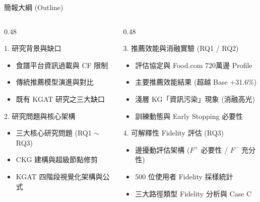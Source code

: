 \documentclass[aspectratio=169, 10pt]{beamer}
\begin{document}
\begin{frame}{簡報大綱 (Outline)}
  \begin{columns}[T]
    \begin{column}{0.48\textwidth}
      \begin{block}{1. 研究背景與缺口}
        \begin{itemize}
          \item 食譜平台資訊過載與 CF 限制
          \item 傳統推薦模型演進與對比
          \item 既有 KGAT 研究之三大缺口
        \end{itemize}
      \end{block}
      
      \begin{block}{2. 研究問題與核心架構}
        \begin{itemize}
          \item 三大核心研究問題 (RQ1 $\sim$ RQ3)
          \item CKG 建構與超級節點修剪
          \item KGAT 四階段視覺化架構與公式
        \end{itemize}
      \end{block}
    \end{column}
    
    \begin{column}{0.48\textwidth}
      \begin{block}{3. 推薦效能與消融實驗 (RQ1 / RQ2)}
        \begin{itemize}
          \item 評估協定與 Food.com 720萬邊 Profile
          \item 主要推薦效能結果 (超越 Base +31.6\%)
          \item 淺層 KG「資訊污染」現象 (消融高光)
          \item 訓練動態與 Early Stopping 必要性
        \end{itemize}
      \end{block}
      
      \begin{block}{4. 可解釋性 Fidelity 評估 (RQ3)}
        \begin{itemize}
          \item 邊擾動評估架構 ($F^+$ 必要性 / $F^-$ 充分性)
          \item 500 位使用者 Fidelity 採樣統計
          \item 三大路徑類型 Fidelity 分析與 Case C
        \end{itemize}
      \end{block}
    \end{column}
  \end{columns}
\end{frame}
\end{document}
